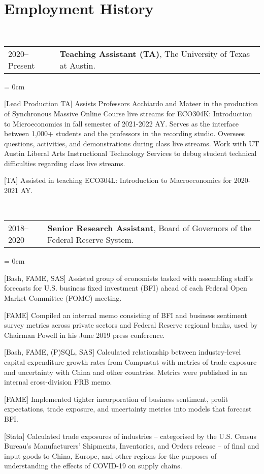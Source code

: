 \documentclass[a4paper, 11pt]{article}
\begin{document}
    \section{Employment History}
      ~\begin{tabular}{ll}
        2020--Present & \textbf{Teaching Assistant (TA)}, The University of Texas at Austin.
      \end{tabular}
      \begin{compactitem}\parskip = 0cm
        \item {[Lead Production TA]} Assists Professors Acchiardo and Mateer in the production of Synchronous Massive Online Course live streams for ECO304K: Introduction to Microeconomics in fall semester of 2021-2022 AY. Serves as the interface between 1,000+ students and the professors in the recording studio. Oversees questions, activities, and demonstrations during class live streams. Work with UT Austin Liberal Arts Instructional Technology Services to debug student technical difficulties regarding class live streams.
        \item {[TA]} Assisted in teaching ECO304L: Introduction to Macroeconomics for 2020-2021 AY.
      \end{compactitem}
      \vspace*{1em}
      
      ~\begin{tabular}{ll}
        2018--2020 & \textbf{Senior Research Assistant}, Board of Governors of the Federal Reserve System.
      \end{tabular}
      \begin{compactitem}\parskip = 0cm
        \item {[Bash, FAME, SAS]} Assisted group of economists tasked with assembling staff's forecasts for U.S. business fixed investment (BFI) ahead of each Federal Open Market Committee (FOMC) meeting.
        \item {[FAME]} Compiled an internal memo consisting of BFI and business sentiment survey metrics across private sectors and Federal Reserve regional banks, used by Chairman Powell in his June 2019 press conference.
        \item {[Bash, FAME, (P)SQL, SAS]} Calculated relationship between industry-level capital expenditure growth rates from Compustat with metrics of trade exposure and uncertainty with China and other countries. Metrics were published in an internal cross-division FRB memo.
        \item {[FAME]} Implemented tighter incorporation of business sentiment, profit expectations, trade exposure, and uncertainty metrics into models that forecast BFI.
        \item {[Stata]} Calculated trade exposures of industries -- categorised by the U.S. Census Bureau's Manufacturers' Shipments, Inventories, and Orders release -- of final and input goods to China, Europe, and other regions for the purposes of understanding the effects of COVID-19 on supply chains.
      \end{compactitem}
      
\end{document}
